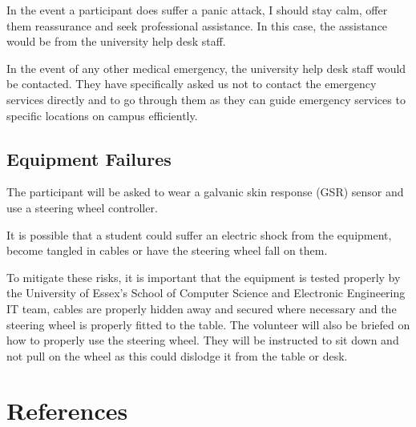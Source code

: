 \documentclass{article}
\begin{document}
In the event a participant does suffer a panic attack, I should stay calm, offer them reassurance and seek professional assistance. In this case, the assistance would be from the university help desk staff.

In the event of any other medical emergency, the university help desk staff would be contacted. They have specifically asked us not to contact the emergency services directly and to go through them as they can guide emergency services to specific locations on campus efficiently.

\subsection{Equipment Failures}

The participant will be asked to wear a galvanic skin response (GSR) sensor and use a steering wheel controller. 

It is possible that a student could suffer an electric shock from the equipment, become tangled in cables or have the steering wheel fall on them.

To mitigate these risks, it is important that the equipment is tested properly by the University of Essex's School of Computer Science and Electronic Engineering IT team, cables are properly hidden away and secured where necessary and the steering wheel is properly fitted to the table. The volunteer will also be briefed on how to properly use the steering wheel. They will be instructed to sit down and not pull on the wheel as this could dislodge it from the table or desk.

\section{References}
\end{document}
